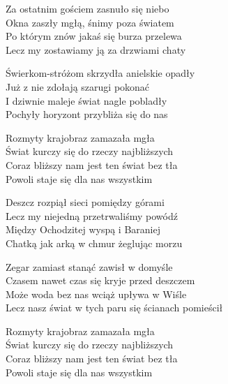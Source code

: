 \begin{text}
Za ostatnim gościem zasnuło się niebo\\
Okna zaszły mgłą, śnimy poza światem\\
Po którym znów jakaś się burza przelewa\\
Lecz my zostawiamy ją za drzwiami chaty

Świerkom-stróżom skrzydła anielskie opadły\\
Już z nie zdołają szarugi pokonać\\
I dziwnie maleje świat nagle pobladły\\
Pochyły horyzont przybliża się do nas

Rozmyty krajobraz zamazała mgła\\
Świat kurczy się do rzeczy najbliższych\\
Coraz bliższy nam jest ten świat bez tła\\
Powoli staje się dla nas wszystkim

Deszcz rozpiął sieci pomiędzy górami\\
Lecz my niejedną przetrwaliśmy powódź\\
Między Ochodzitej wyspą i Baraniej\\
Chatką jak arką w chmur żeglując morzu

Zegar zamiast stanąć zawisł w domyśle\\
Czasem nawet czas się kryje przed deszczem\\
Może woda bez nas wciąż upływa w Wiśle\\
Lecz nasz świat w tych paru się ścianach pomieścił

Rozmyty krajobraz zamazała mgła\\
Świat kurczy się do rzeczy najbliższych\\
Coraz bliższy nam jest ten świat bez tła\\
Powoli staje się dla nas wszystkim
\end{text}
